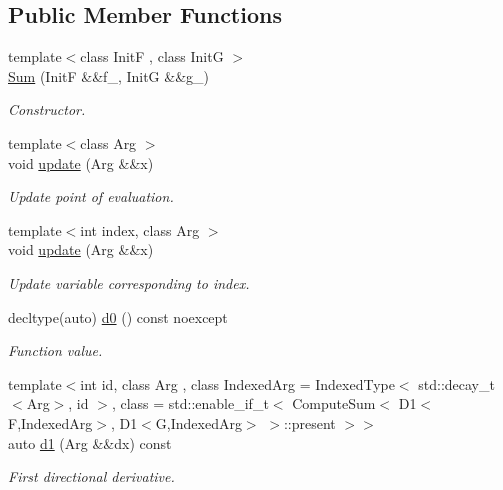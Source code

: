 \subsection*{Public Member Functions}
\begin{DoxyCompactItemize}
\item 
{\footnotesize template$<$class Init\-F , class Init\-G $>$ }\\\hyperlink{structFunG_1_1MathematicalOperations_1_1Sum_a7b04c111c5f6f2bafda3684f262d146e}{Sum} (Init\-F \&\&f\-\_\-, Init\-G \&\&g\-\_\-)
\begin{DoxyCompactList}\small\item\em Constructor. \end{DoxyCompactList}\item 
{\footnotesize template$<$class Arg $>$ }\\void \hyperlink{structFunG_1_1MathematicalOperations_1_1Sum_a15985be13a1838d868d2adce8e4f5402}{update} (Arg \&\&x)
\begin{DoxyCompactList}\small\item\em Update point of evaluation. \end{DoxyCompactList}\item 
{\footnotesize template$<$int index, class Arg $>$ }\\void \hyperlink{structFunG_1_1MathematicalOperations_1_1Sum_a4e10622e11a29d739f0d4db364980f9a}{update} (Arg \&\&x)
\begin{DoxyCompactList}\small\item\em Update variable corresponding to index. \end{DoxyCompactList}\item 
decltype(auto) \hyperlink{structFunG_1_1MathematicalOperations_1_1Sum_ac95658b8dae3f165fe612f056daecb30}{d0} () const noexcept
\begin{DoxyCompactList}\small\item\em Function value. \end{DoxyCompactList}\item 
{\footnotesize template$<$int id, class Arg , class Indexed\-Arg  = Indexed\-Type$<$ std\-::decay\-\_\-t$<$\-Arg$>$, id $>$, class  = std\-::enable\-\_\-if\-\_\-t$<$ Compute\-Sum$<$ D1$<$\-F,\-Indexed\-Arg$>$, D1$<$\-G,\-Indexed\-Arg$>$ $>$\-::present $>$$>$ }\\auto \hyperlink{structFunG_1_1MathematicalOperations_1_1Sum_aee8c204769ab30f5ae68f9a8b0fa9bf8}{d1} (Arg \&\&dx) const 
\begin{DoxyCompactList}\small\item\em First directional derivative. \end{DoxyCompactList}\item 

\end{DoxyCompactItemize}
